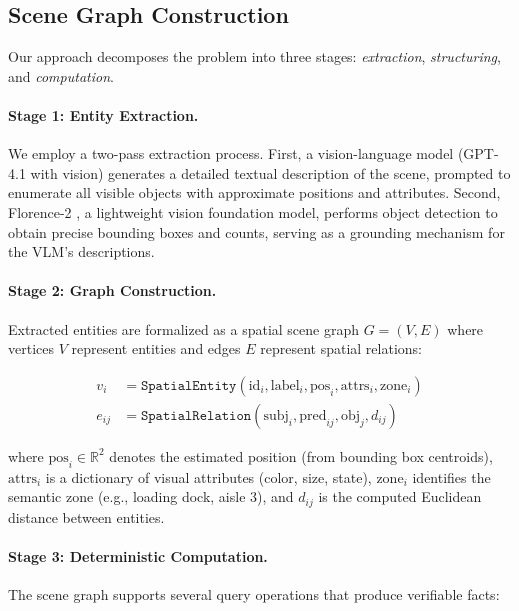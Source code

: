 \documentclass[11pt]{article}
\begin{document}
\subsection{Scene Graph Construction}

Our approach decomposes the problem into three stages: \emph{extraction}, \emph{structuring}, and \emph{computation}.

\paragraph{Stage 1: Entity Extraction.}
We employ a two-pass extraction process. First, a vision-language model (GPT-4.1 with vision) generates a detailed textual description of the scene, prompted to enumerate all visible objects with approximate positions and attributes. Second, Florence-2 \citep{xiao2024florence2}, a lightweight vision foundation model, performs object detection to obtain precise bounding boxes and counts, serving as a grounding mechanism for the VLM's descriptions.

\paragraph{Stage 2: Graph Construction.}
Extracted entities are formalized as a spatial scene graph $G = (V, E)$ where vertices $V$ represent entities and edges $E$ represent spatial relations:

\begin{align}
  v_i &= \texttt{SpatialEntity}(\text{id}_i, \text{label}_i, \text{pos}_i, \text{attrs}_i, \text{zone}_i) \label{eq:entity} \\
  e_{ij} &= \texttt{SpatialRelation}(\text{subj}_i, \text{pred}_{ij}, \text{obj}_j, d_{ij}) \label{eq:relation}
\end{align}

where $\text{pos}_i \in \mathbb{R}^2$ denotes the estimated position (from bounding box centroids), $\text{attrs}_i$ is a dictionary of visual attributes (color, size, state), $\text{zone}_i$ identifies the semantic zone (e.g., loading dock, aisle 3), and $d_{ij}$ is the computed Euclidean distance between entities.

\paragraph{Stage 3: Deterministic Computation.}
The scene graph supports several query operations that produce verifiable facts:
\end{document}
